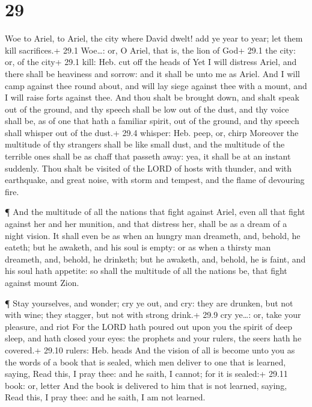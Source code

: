 \hypertarget{section-28}{%
\section{29}\label{section-28}}

 Woe to Ariel, to Ariel, the city where David dwelt! add ye
year to year; let them kill sacrifices.+ 29.1 Woe\ldots: or, O Ariel,
that is, the lion of God+ 29.1 the city: or, of the city+ 29.1 kill:
Heb. cut off the heads of  Yet I will distress Ariel, and
there shall be heaviness and sorrow: and it shall be unto me as Ariel.
 And I will camp against thee round about, and will lay
siege against thee with a mount, and I will raise forts against thee.
 And thou shalt be brought down, and shalt speak out of the
ground, and thy speech shall be low out of the dust, and thy voice shall
be, as of one that hath a familiar spirit, out of the ground, and thy
speech shall whisper out of the dust.+ 29.4 whisper: Heb. peep, or,
chirp  Moreover the multitude of thy strangers shall be like
small dust, and the multitude of the terrible ones shall be as chaff
that passeth away: yea, it shall be at an instant suddenly. 
Thou shalt be visited of the LORD of hosts with thunder, and with
earthquake, and great noise, with storm and tempest, and the flame of
devouring fire.

 ¶ And the multitude of all the nations that fight against
Ariel, even all that fight against her and her munition, and that
distress her, shall be as a dream of a night vision.  It
shall even be as when an hungry man dreameth, and, behold, he eateth;
but he awaketh, and his soul is empty: or as when a thirsty man
dreameth, and, behold, he drinketh; but he awaketh, and, behold, he is
faint, and his soul hath appetite: so shall the multitude of all the
nations be, that fight against mount Zion.

 ¶ Stay yourselves, and wonder; cry ye out, and cry: they
are drunken, but not with wine; they stagger, but not with strong
drink.+ 29.9 cry ye\ldots: or, take your pleasure, and riot
 For the LORD hath poured out upon you the spirit of deep
sleep, and hath closed your eyes: the prophets and your rulers, the
seers hath he covered.+ 29.10 rulers: Heb. heads  And the
vision of all is become unto you as the words of a book that is sealed,
which men deliver to one that is learned, saying, Read this, I pray
thee: and he saith, I cannot; for it is sealed:+ 29.11 book: or, letter
 And the book is delivered to him that is not learned,
saying, Read this, I pray thee: and he saith, I am not learned.

